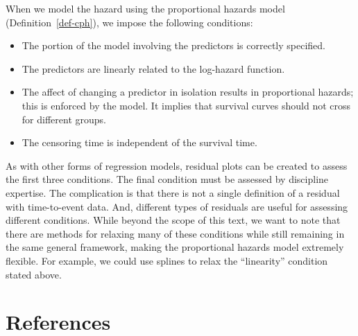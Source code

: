 \documentclass[
  letterpaper,
  DIV=11,
  numbers=noendperiod]{scrreprt}
\providecommand{\tightlist}{%
  \setlength{\itemsep}{0pt}\setlength{\parskip}{0pt}}\usepackage{longtable,booktabs,array}
\theoremstyle{definition}
\theoremstyle{definition}
\theoremstyle{remark}
\begin{document}
\begin{tcolorbox}[enhanced jigsaw, left=2mm, toprule=.15mm, arc=.35mm, breakable, opacitybacktitle=0.6, opacityback=0, rightrule=.15mm, colbacktitle=quarto-callout-note-color!10!white, coltitle=black, leftrule=.75mm, toptitle=1mm, colframe=quarto-callout-note-color-frame, titlerule=0mm, title=\textcolor{quarto-callout-note-color}{\faInfo}\hspace{0.5em}{Conditions of the Proportional Hazards Model}, bottomrule=.15mm, colback=white, bottomtitle=1mm]

When we model the hazard using the proportional hazards model
(Definition~\ref{def-cph}), we impose the following conditions:

\begin{itemize}
\tightlist
\item
  The portion of the model involving the predictors is correctly
  specified.
\item
  The predictors are linearly related to the log-hazard function.
\item
  The affect of changing a predictor in isolation results in
  proportional hazards; this is enforced by the model. It implies that
  survival curves should not cross for different groups.
\item
  The censoring time is independent of the survival time.
\end{itemize}

\end{tcolorbox}

As with other forms of regression models, residual plots can be created
to assess the first three conditions. The final condition must be
assessed by discipline expertise. The complication is that there is not
a single definition of a residual with time-to-event data. And,
different types of residuals are useful for assessing different
conditions. While beyond the scope of this text, we want to note that
there are methods for relaxing many of these conditions while still
remaining in the same general framework, making the proportional hazards
model extremely flexible. For example, we could use splines to relax the
``linearity'' condition stated above.


\hypertarget{references}{%
\chapter*{References}\label{references}}
\end{document}

